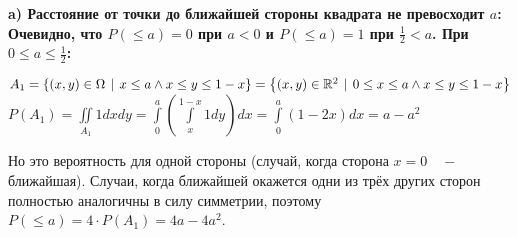 \documentclass{article}
\begin{document}
	\bf a) \rm Расстояние от точки до ближайшей стороны квадрата не превосходит $a$:\\
	Очевидно, что $P(\leq a) = 0$ при $a < 0$ и $P(\leq a)=1$ при $\frac{1}{2}<a$. При $0 \leq a \leq \frac{1}{2}$: \\
	\begin{center}
		$A_1 = \left\lbrace(x, y) \in \Omega \hspace{4px}|\hspace{4px} x \leq a \wedge x \leq y \leq 1-x \right\rbrace
		= \left\lbrace(x, y) \in \mathbb{R}^2 \hspace{4px}|\hspace{4px} 0\leq x \leq a \wedge x \leq y \leq 1-x  \right\rbrace$ \\
		$P(A_1) = \iint\limits_{A_1}1dxdy = \int\limits_0^a \left( \int\limits_x^{1-x} 1dy \right)dx 
		= \int\limits_0^a (1 - 2x)dx = a - a^2$
	\end{center}
	Но это вероятность для одной стороны (случай, когда сторона $x = 0 \quad-$  ближайшая). Случаи, когда ближайшей окажется одни из трёх других сторон полностью аналогичны в силу симметрии, поэтому $P(\leq a) = 4\cdot P(A_1) = 4a - 4a^2$.
\end{document}
